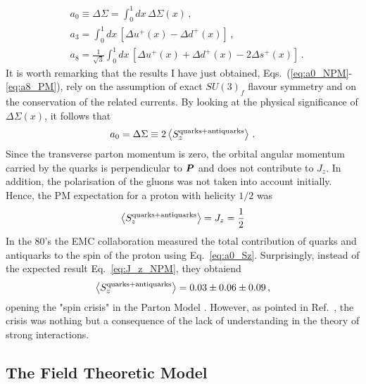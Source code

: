 \begin{align}
  & a_0 \equiv \Delta \Sigma = \int_{0}^{1} dx \, \Delta \Sigma(x) \,, 
  \label{eq:a0_NPM}
  \\
  & a_3 = \int_{0}^{1} dx \, \left[ \Delta u^{+}(x) - \Delta d^{+}(x) \right] \,,
  \label{eq:a3_PM}
  \\
  & a_8 = \frac{1}{\sqrt{3}}\int_{0}^{1} dx \, \left[ \Delta u^{+}(x) + \Delta d^{+}(x) - 2 \Delta s^{+}(x) \right] \,.
  \label{eq:a8_PM}
\end{align}
It is worth remarking that the results I have just obtained, Eqs.~(\ref{eq:a0_NPM}-\ref{eq:a8_PM}), rely on the assumption of exact $SU(3)_f$ flavour symmetry and on the conservation of the related currents. By looking at the physical significance of $\Delta \Sigma (x)$, it follows that
\begin{equation}
  a_0 = \Delta \Sigma \equiv 2 \left< S_{z}^{\textrm{quarks} + \textrm{antiquarks}} \right> \,.
  \label{eq:a0_Sz}
\end{equation}
Since the transverse parton momentum is zero, the orbital angular momentum carried by the quarks is perpendicular to $\vb*{P}$ and does not contribute to $J_{z}$. In addition, the polarisation of the gluons was not taken into account initially. Hence, the PM expectation for a proton with helicity $1/2$ was 
\begin{equation}
  \left< S_{z}^{\textrm{quarks} + \textrm{antiquarks}} \right> = J_{z} = \frac{1}{2}
  \label{eq:J_z_NPM}
\end{equation}
In the 80's the EMC collaboration measured the total contribution of quarks and antiquarks to the spin of the proton \cite{EuropeanMuon:1989yki} using Eq.~\eqref{eq:a0_Sz}. Surprisingly, instead of the expected result Eq.~\eqref{eq:J_z_NPM}, they obtaiend
\begin{equation}
  \left< S_{z}^{\textrm{quarks} + \textrm{antiquarks}} \right> = 0.03 \pm 0.06 \pm 0.09 \,,
  \label{eq:EMC_exp}
\end{equation}
opening the "spin crisis" in the Parton Model \cite{Leader_Anselmino}. However, as pointed in Ref.~\cite{Leader:2016sli}, the  crisis was nothing but a consequence of the lack of understanding in the theory of strong interactions. 

\subsection{The Field Theoretic Model}
\label{sec:field_theoretic}

